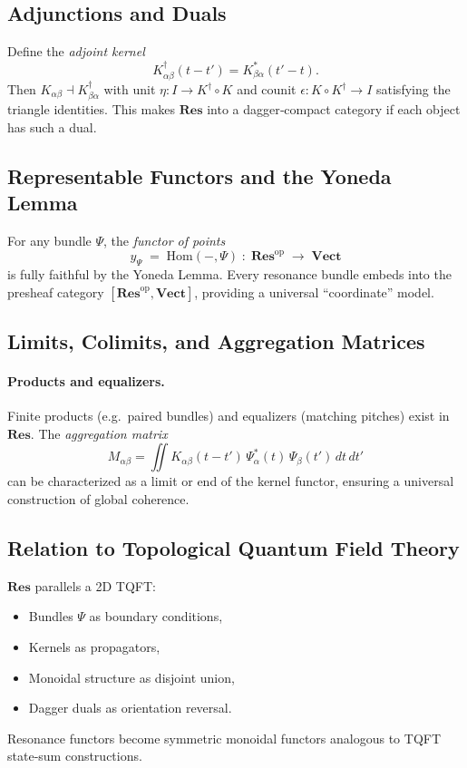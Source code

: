 \subsection{Adjunctions and Duals}

Define the \emph{adjoint kernel}
\[
  K_{\alpha\beta}^{\dagger}(t-t')
  = K_{\beta\alpha}^{*}(t'-t).
\]
Then \(K_{\alpha\beta}\dashv K_{\beta\alpha}^{\dagger}\) with unit
\(\eta\colon I\to K^{\dagger}\circ K\)
and counit
\(\epsilon\colon K\circ K^{\dagger}\to I\)
satisfying the triangle identities.  This makes \(\mathbf{Res}\) into a dagger‐compact category if each object has such a dual.

\subsection{Representable Functors and the Yoneda Lemma}

For any bundle \(\Psi\), the \emph{functor of points}
\[
  y_{\Psi}\;=\;\mathrm{Hom}(-,\Psi)
  \;:\;\mathbf{Res}^{\mathrm{op}}\;\longrightarrow\;\mathbf{Vect}
\]
is fully faithful by the Yoneda Lemma.  Every resonance bundle embeds into the presheaf category \([\mathbf{Res}^{\mathrm{op}},\mathbf{Vect}]\), providing a universal “coordinate” model.

\subsection{Limits, Colimits, and Aggregation Matrices}

\paragraph{Products and equalizers.}  Finite products (e.g.\ paired bundles) and equalizers (matching pitches) exist in \(\mathbf{Res}\).  The \emph{aggregation matrix}
\[
  M_{\alpha\beta}
  = \iint K_{\alpha\beta}(t-t')\,\Psi_{\alpha}^{*}(t)\,\Psi_{\beta}(t')\,dt\,dt'
\]
can be characterized as a limit or end of the kernel functor, ensuring a universal construction of global coherence.


\subsection{Relation to Topological Quantum Field Theory}

\(\mathbf{Res}\) parallels a 2D TQFT:
\begin{itemize}
  \item Bundles \(\Psi\) as boundary conditions,
  \item Kernels as propagators,
  \item Monoidal structure as disjoint union,
  \item Dagger duals as orientation reversal.
\end{itemize}
Resonance functors become symmetric monoidal functors analogous to TQFT state‐sum constructions.

